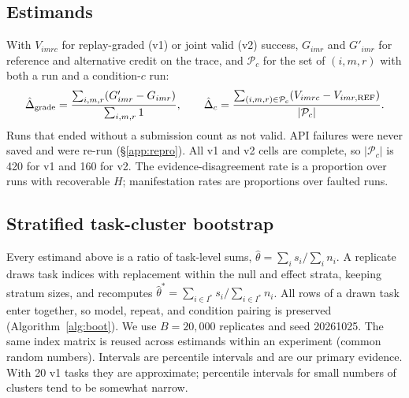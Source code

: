 \subsection{Estimands}
\label{app:stats-estimands}
With $V_{imrc}$ for replay-graded (v1) or joint valid (v2) success, $G_{imr}$ and
$G'_{imr}$ for reference and alternative credit on the  trace, and
$\mathcal{P}_c$ for the set of $(i,m,r)$ with both a  run and a
condition-$c$ run:
\begin{equation}
\hat\Delta_{\text{grade}}=\frac{\sum_{i,m,r}(G'_{imr}-G_{imr})}{\sum_{i,m,r}1},\qquad
\hat\Delta_c=\frac{\sum_{(i,m,r)\in\mathcal{P}_c}(V_{imrc}-V_{imr,\fld{ref}})}{|\mathcal{P}_c|}.
\end{equation}
Runs that ended without a submission count as not valid. API failures were
never saved and were re-run (\S\ref{app:repro}). All v1 and v2 cells are
complete, so $|\mathcal{P}_c|$ is 420 for v1 and 160 for v2. The
evidence-disagreement rate is a proportion over runs with recoverable $H$;
manifestation rates are proportions over faulted runs.

\subsection{Stratified task-cluster bootstrap}
\label{app:stats-boot}
Every estimand above is a ratio of task-level sums,
$\hat\theta=\sum_i s_i/\sum_i n_i$. A replicate draws task indices with
replacement within the null and effect strata, keeping stratum sizes, and
recomputes $\hat\theta^{*}=\sum_{i\in I^*}s_i/\sum_{i\in I^*}n_i$. All rows
of a drawn task enter together, so model, repeat, and condition pairing is
preserved (Algorithm~\ref{alg:boot}). We use $B=20{,}000$ replicates and seed
20261025. The same index matrix is reused across estimands within an
experiment (common random numbers). Intervals are percentile intervals and are our primary
evidence. With 20 v1 tasks they are approximate; percentile intervals for
small numbers of clusters tend to be somewhat narrow.

